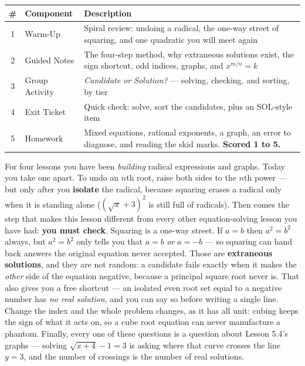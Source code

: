 \documentclass[10pt]{article}
\begin{document}
\begin{tocbox}
\small
\renewcommand{\arraystretch}{1.5}
\begin{tabularx}{\linewidth}{@{} c l X @{}}
\rowcolor{forestbg}
\textbf{\#} & \textbf{Component} & \textbf{Description} \\
\midrule
1 & Warm-Up        & Spiral review: undoing a radical, the one-way street of squaring, and one quadratic you will meet again \\
2 & Guided Notes   & The four-step method, why extraneous solutions exist, the sign shortcut, odd indices, graphs, and $x^{m/n}=k$ \\
3 & Group Activity & \emph{Candidate or Solution?} --- solving, checking, and sorting, by tier \\
4 & Exit Ticket    & Quick check: solve, sort the candidates, plus an SOL-style item \\
5 & Homework       & Mixed equations, rational exponents, a graph, an error to diagnose, and reading the skid marks. \textbf{Scored 1 to 5.} \\
\end{tabularx}
\end{tocbox}

\vspace{0.10in}

\begin{remindbox}
\small For four lessons you have been \emph{building} radical expressions and graphs. Today you take
one apart. To undo an $n$th root, raise both sides to the $n$th power --- but only after you
\textbf{isolate} the radical, because squaring erases a radical only when it is standing alone
($\left(\sqrt{x}+3\right)^{2}$ is still full of radicals). Then comes the step that makes this
lesson different from every other equation-solving lesson you have had: \textbf{you must check}.
Squaring is a one-way street. If $a=b$ then $a^{2}=b^{2}$ always, but $a^{2}=b^{2}$ only tells you
that $a=b$ \emph{or} $a=-b$ --- so squaring can hand back answers the original equation never
accepted. Those are \textbf{extraneous solutions}, and they are not random: a candidate fails
exactly when it makes the \emph{other} side of the equation negative, because a principal square
root never is. That also gives you a free shortcut --- an isolated even root set equal to a negative
number has \emph{no real solution}, and you can say so before writing a single line. Change the
index and the whole problem changes, as it has all unit: cubing keeps the sign of what it acts on,
so a cube root equation can never manufacture a phantom. Finally, every one of these questions is a
question about Lesson 5.4's graphs --- solving $\sqrt{x+4}-1=3$ is asking where that curve crosses
the line $y=3$, and the number of crossings is the number of real solutions.
\end{remindbox}
\end{document}
